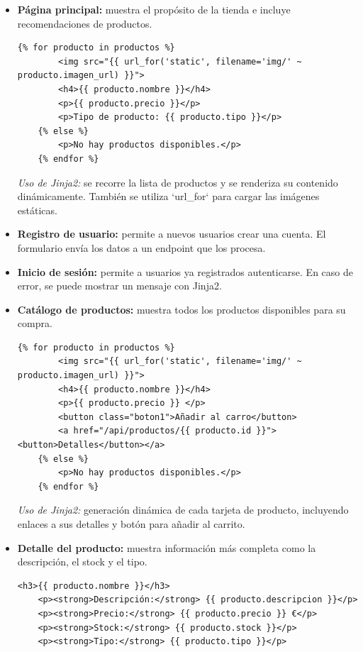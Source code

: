 \documentclass[10pt]{book}
\begin{document}
\begin{itemize}
    \item \textbf{Página principal:} muestra el propósito de la tienda e incluye recomendaciones de productos.
    
    \begin{lstlisting}[style=bonitoJinja]
    {% for producto in productos %}
        <img src="{{ url_for('static', filename='img/' ~ producto.imagen_url) }}">
        <h4>{{ producto.nombre }}</h4>
        <p>{{ producto.precio }}</p>
        <p>Tipo de producto: {{ producto.tipo }}</p>
    {% else %}
        <p>No hay productos disponibles.</p>
    {% endfor %}
    \end{lstlisting}

    \textit{Uso de Jinja2:} se recorre la lista de productos y se renderiza su contenido dinámicamente. También se utiliza `url\_for` para cargar las imágenes estáticas.

    \item \textbf{Registro de usuario:} permite a nuevos usuarios crear una cuenta. El formulario envía los datos a un endpoint que los procesa.

    \item \textbf{Inicio de sesión:} permite a usuarios ya registrados autenticarse. En caso de error, se puede mostrar un mensaje con Jinja2.

    \item \textbf{Catálogo de productos:} muestra todos los productos disponibles para su compra.

    \begin{lstlisting}[style=bonitoJinja]
    {% for producto in productos %}
        <img src="{{ url_for('static', filename='img/' ~ producto.imagen_url) }}">
        <h4>{{ producto.nombre }}</h4>
        <p>{{ producto.precio }} </p>
        <button class="boton1">Añadir al carro</button>
        <a href="/api/productos/{{ producto.id }}"><button>Detalles</button></a>
    {% else %}
        <p>No hay productos disponibles.</p>
    {% endfor %}
    \end{lstlisting}

    \textit{Uso de Jinja2:} generación dinámica de cada tarjeta de producto, incluyendo enlaces a sus detalles y botón para añadir al carrito.

    \item \textbf{Detalle del producto:} muestra información más completa como la descripción, el stock y el tipo.

    \begin{lstlisting}[style=bonitoJinja]
    <h3>{{ producto.nombre }}</h3>
    <p><strong>Descripción:</strong> {{ producto.descripcion }}</p>
    <p><strong>Precio:</strong> {{ producto.precio }} €</p>
    <p><strong>Stock:</strong> {{ producto.stock }}</p>
    <p><strong>Tipo:</strong> {{ producto.tipo }}</p>
    \end{lstlisting}


\end{itemize}
\end{document}
